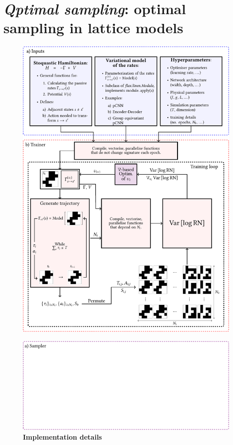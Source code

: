 \section[\emph{Qptimal sampling}]{\emph{Qptimal sampling}: optimal sampling in lattice models}
\label{sec:qoptsampl}
\begin{figure}[h]
	\centering
	\includegraphics[width=\linewidth]{Chapter4/Figs/Vector/qsampl1}
\end{figure}
\begin{figure}[t]
	\ContinuedFloat
	\centering
	\includegraphics[width=\linewidth]{Chapter4/Figs/Vector/qsampl2}
	\caption[Implementation details]{\textbf{Implementation details}}
	\label{fig:qsampl}
\end{figure}

